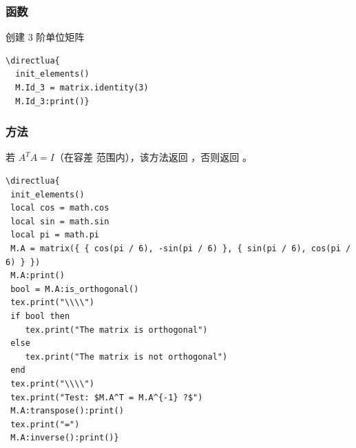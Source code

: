 \subsubsection{函数 }
\label{ssub:method_identity}

创建 3 阶单位矩阵


\begin{minipage}{.5\textwidth}
\begin{verbatim}
\directlua{
  init_elements()
  M.Id_3 = matrix.identity(3)
  M.Id_3:print()}
\end{verbatim}
\end{minipage}
\begin{minipage}{.5\textwidth}
\end{minipage}

\subsubsection{方法 }
\label{ssub:method_is_orthogonal}

若 $A^TA = I$（在容差  范围内），该方法返回 ，否则返回 。

\begin{verbatim}
\directlua{
 init_elements()
 local cos = math.cos
 local sin = math.sin
 local pi = math.pi
 M.A = matrix({ { cos(pi / 6), -sin(pi / 6) }, { sin(pi / 6), cos(pi / 6) } })
 M.A:print()
 bool = M.A:is_orthogonal()
 tex.print("\\\\")
 if bool then
 	tex.print("The matrix is orthogonal")
 else
 	tex.print("The matrix is not orthogonal")
 end
 tex.print("\\\\")
 tex.print("Test: $M.A^T = M.A^{-1} ?$")
 M.A:transpose():print()
 tex.print("=")
 M.A:inverse():print()}
\end{verbatim}


